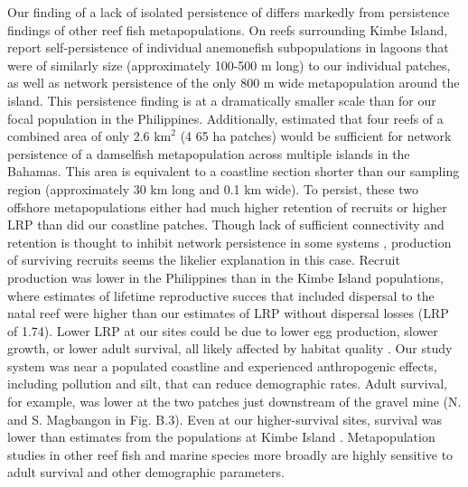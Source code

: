 \documentclass[12pt, oneside]{article}   	%
\begin{document}
Our finding of a lack of isolated persistence of differs markedly from persistence findings of other reef fish metapopulations. On reefs surrounding Kimbe Island, \cite{salles_coral_2015} report self-persistence of individual anemonefish subpopulations in lagoons that were of similarly size (approximately 100-500 m long) to our individual patches, as well as network persistence of the only 800 m wide metapopulation around the island. This persistence finding is at a dramatically smaller scale than for our focal population in the Philippines. Additionally, \cite{johnson2018integrating} estimated that four reefs of a combined area of only 2.6 $\text{km}^2$ (4 65 ha patches) would be sufficient for network persistence of a damselfish metapopulation across multiple islands in the Bahamas. This area is equivalent to a coastline section shorter than our sampling region (approximately 30 km long and 0.1 km wide). To persist, these two offshore metapopulations either had much higher retention of recruits or higher LRP than did our coastline patches. Though lack of sufficient connectivity and retention is thought to inhibit network persistence in some systems \citep[e.g., insufficient retention of offspring within reserves for eastern oysters (\textit{Crassostrea virginica}) in North Carolina;][]{puckett2016metapopulation}, production of surviving recruits seems the likelier explanation in this case. Recruit production was lower in the Philippines than in the Kimbe Island populations, where estimates of lifetime reproductive succes that included dispersal to the natal reef \citep{salles2020strong} were higher than our estimates of LRP without dispersal losses (LRP of 1.74). Lower LRP at our sites could be due to lower egg production, slower growth, or lower adult survival, all likely affected by habitat quality \citep[e.g.][]{salles2020strong, hayashi2019low}. Our study system was near a populated coastline and experienced anthropogenic effects, including pollution and silt, that can reduce demographic rates. Adult survival, for example, was lower at the two patches just downstream of the gravel mine (N. and S. Magbangon in Fig. B.3). Even at our higher-survival sites, survival was lower than estimates from the populations at Kimbe Island \citep[85\% annual survival,][]{salles_coral_2015}. Metapopulation studies in other reef fish \citep[e.g.][]{figueira2009connectivity} and marine species more broadly \citep{carson2011evaluating} are highly sensitive to adult survival and other demographic parameters.
\end{document}
